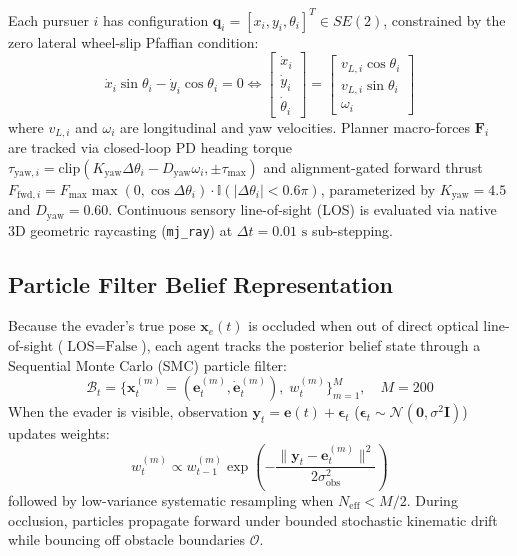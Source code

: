 \documentclass[conference]{IEEEtran}
\begin{document}
Each pursuer $i$ has configuration $\mathbf{q}_i = [x_i, y_i, \theta_i]^T \in SE(2)$, constrained by the zero lateral wheel-slip Pfaffian condition:
\begin{equation}
    \dot{x}_i \sin\theta_i - \dot{y}_i \cos\theta_i = 0 \iff 
    \begin{bmatrix} \dot{x}_i \\ \dot{y}_i \\ \dot{\theta}_i \end{bmatrix} = 
    \begin{bmatrix} v_{L,i} \cos\theta_i \\ v_{L,i} \sin\theta_i \\ \omega_i \end{bmatrix}
    \label{eq:unicycle_constraint}
\end{equation}
where $v_{L, i}$ and $\omega_i$ are longitudinal and yaw velocities. Planner macro-forces $\mathbf{F}_i$ are tracked via closed-loop PD heading torque $\tau_{\text{yaw}, i} = \text{clip}(K_{\text{yaw}} \Delta\theta_i - D_{\text{yaw}} \omega_i, \pm\tau_{\max})$ and alignment-gated forward thrust $F_{\text{fwd}, i} = F_{\max} \max(0, \cos\Delta\theta_i) \cdot \mathbb{I}(|\Delta\theta_i| < 0.6\pi)$, parameterized by $K_{\text{yaw}}=4.5$ and $D_{\text{yaw}}=0.60$. Continuous sensory line-of-sight (LOS) is evaluated via native 3D geometric raycasting (\texttt{mj\_ray}) at $\Delta t = 0.01\text{ s}$ sub-stepping.

\subsection{Particle Filter Belief Representation}
Because the evader's true pose $\mathbf{x}_e(t)$ is occluded when out of direct optical line-of-sight ($\text{LOS} = \text{False}$), each agent tracks the posterior belief state through a Sequential Monte Carlo (SMC) particle filter:
\begin{equation}
    \mathcal{B}_t = \big\{ \mathbf{x}_t^{(m)} = (\mathbf{e}_t^{(m)}, \dot{\mathbf{e}}_t^{(m)}), \; w_t^{(m)} \big\}_{m=1}^M, \quad M = 200
\end{equation}
When the evader is visible, observation $\mathbf{y}_t = \mathbf{e}(t) + \boldsymbol{\epsilon}_t$ ($\boldsymbol{\epsilon}_t \sim \mathcal{N}(\mathbf{0}, \sigma^2 \mathbf{I})$) updates weights:
\begin{equation}
    w_t^{(m)} \propto w_{t-1}^{(m)} \exp\left( -\frac{\|\mathbf{y}_t - \mathbf{e}_t^{(m)}\|^2}{2\sigma_{\text{obs}}^2} \right)
\end{equation}
followed by low-variance systematic resampling when $N_{\text{eff}} < M/2$. During occlusion, particles propagate forward under bounded stochastic kinematic drift while bouncing off obstacle boundaries $\mathcal{O}$.
\end{document}
